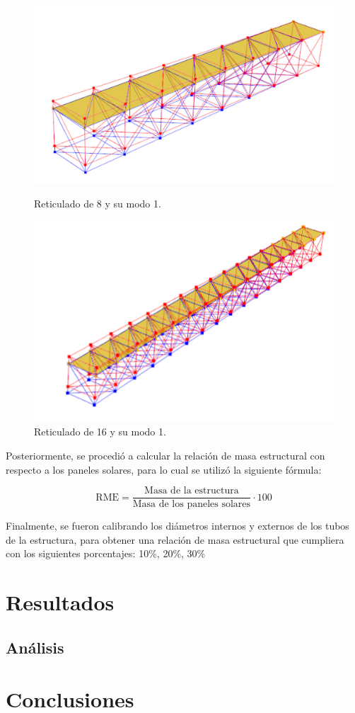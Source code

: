 \begin{figure}[H]
    \begin{minipage}[b]{0.5\textwidth}
        \centering
        \includegraphics[width=\textwidth]{FOTOS/m1_8.png}
        \caption{Reticulado de 8 y su modo 1.}
    \end{minipage}
    \hfill
    \begin{minipage}[b]{0.5\textwidth}
        \centering
        \includegraphics[width=\textwidth]{FOTOS/m1_16.png}
        \caption{Reticulado de 16 y su modo 1.}
    \end{minipage}
\end{figure}

Posteriormente, se procedió a calcular la relación de masa estructural con respecto a los paneles solares, para lo cual se utilizó la siguiente fórmula:

\begin{equation}
    \text{RME} = \frac{\text{Masa de la estructura}}{\text{Masa de los paneles solares}} \cdot 100
\end{equation}

Finalmente, se fueron calibrando los diámetros internos y externos de los tubos de la estructura, para obtener una relación de masa estructural que cumpliera con los siguientes porcentajes: 10\%, 20\%, 30\%


\section{Resultados}

\subsection{Análisis}



\section{Conclusiones}